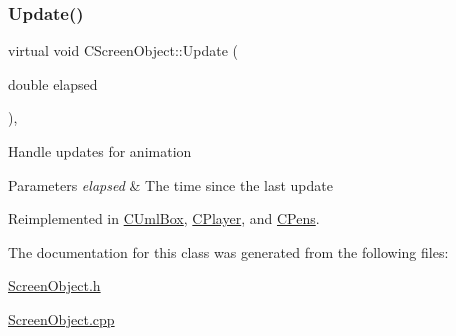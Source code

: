 \subsubsection{\texorpdfstring{Update()}{Update()}}
{\footnotesize\ttfamily virtual void C\+Screen\+Object\+::\+Update (\begin{DoxyParamCaption}\item[{double}]{elapsed }\end{DoxyParamCaption})\hspace{0.3cm}{\ttfamily [inline]}, {\ttfamily [virtual]}}

Handle updates for animation 
\begin{DoxyParams}{Parameters}
{\em elapsed} & The time since the last update \\
\hline
\end{DoxyParams}


Reimplemented in \mbox{\hyperlink{class_c_uml_box_a75d4af7b7c119ff62babceb345d81427}{C\+Uml\+Box}}, \mbox{\hyperlink{class_c_player_a0a17b9e8c553dcf8a97b5ed6070ad560}{C\+Player}}, and \mbox{\hyperlink{class_c_pens_ae4a11a23cb7a91edc9b222f4b8a2f20f}{C\+Pens}}.



The documentation for this class was generated from the following files\+:\begin{DoxyCompactItemize}
\item 
\mbox{\hyperlink{_screen_object_8h}{Screen\+Object.\+h}}\item 
\mbox{\hyperlink{_screen_object_8cpp}{Screen\+Object.\+cpp}}\end{DoxyCompactItemize}
